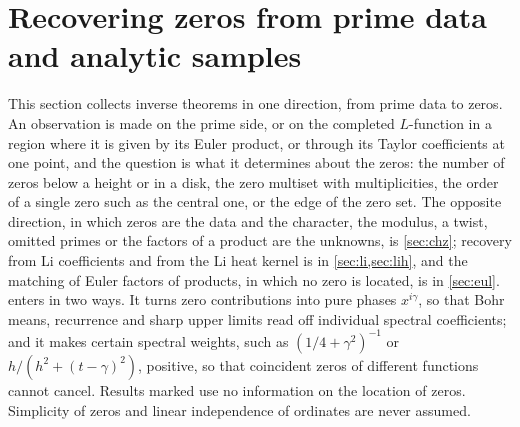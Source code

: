 \providecommand{\hecsgn}{\operatorname{sgn}}
\providecommand{\hecVar}{\operatorname{Var}}
\providecommand{\hecCov}{\operatorname{Cov}}
\providecommand{\hecE}{\mathbb{E}}
\providecommand{\hecind}{\mathbf{1}}
\providecommand{\anapos}[1]{\bigl(#1\bigr)_{+}}
\providecommand{\ananeg}[1]{\bigl(#1\bigr)_{-}}
\providecommand{\anaone}{\mathbf{1}}
\providecommand{\anaE}{\mathcal{E}}
\providecommand{\anaEx}{\mathbb{E}}
\providecommand{\anaPr}{\mathbb{P}}
\providecommand{\anaM}{\mathcal{M}}
\providecommand{\anaW}{\mathcal{W}}
\providecommand{\anaZ}{\mathcal{Z}}
\providecommand{\anaC}{\mathcal{C}}
\section{Recovering zeros from prime data and analytic samples}\label{sec:rec}
\providecommand{\recsinc}{\operatorname{sinc}}
\providecommand{\recgE}{\gamma_{\mathrm{E}}}
\providecommand{\recGen}{\operatorname{Gen}}
\providecommand{\recav}{\operatorname{av}}
\providecommand{\recA}{\mathcal{A}}
\providecommand{\recartanh}{\operatorname{artanh}}

This section collects inverse theorems in one direction, from prime data to zeros. An
observation is made on the prime side, or on the completed $L$-function in a region where it is
given by its Euler product, or through its Taylor coefficients at one point, and the question is
what it determines about the zeros: the number of zeros below a height or in a disk, the zero
multiset with multiplicities, the order of a single zero such as the central one, or the edge
of the zero set. The opposite direction, in which zeros are the data and the character, the
modulus, a twist, omitted primes or the factors of a product are the unknowns, is
\cref{sec:chz}; recovery from Li coefficients and from the Li heat kernel is in
\cref{sec:li,sec:lih}, and the matching of Euler factors of products, in which no zero is
located, is in \cref{sec:eul}.  enters in two ways. It turns zero contributions into pure phases
$x^{i\gamma}$, so that Bohr means, recurrence and sharp upper limits read off individual
spectral coefficients; and it makes certain spectral weights, such as $(1/4+\gamma^2)^{-1}$
or $h/(h^2+(t-\gamma)^2)$, positive, so that coincident zeros of different functions cannot
cancel. Results marked \stU{} use no information on the location of zeros. Simplicity of
zeros and linear independence of ordinates are never assumed.

